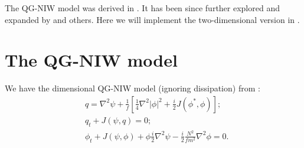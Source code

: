 \graphicspath{{2D_QGNIW/figs/}}

The QG-NIW model was derived in \cite{XieVanneste_15}. It has been since further explored and expanded by \cite{WagnerYoung_15, WagnerYoung_16, AsselinYoung_19} and others. Here we will implement the two-dimensional version in \cite{RochaEtAl_18}. 

\section{The QG-NIW model}
We have the dimensional QG-NIW model (ignoring dissipation) from \cite[(2.6--8)]{RochaEtAl_18}:
\begin{align}
    &q = \nabla^2\psi + \frac{1}{f}\left[\frac{1}{4}\nabla^2|\phi|^2+\frac{i}{2}J(\phi^*,\phi)\right];\\
    &q_t + J(\psi,q) = 0;\\
    &\phi_t+J(\psi,\phi)+\phi\frac{i}{2}\nabla^2\psi-\frac{i}{2} \frac{N^2}{f m^2} \nabla^2\phi = 0.
\end{align}

